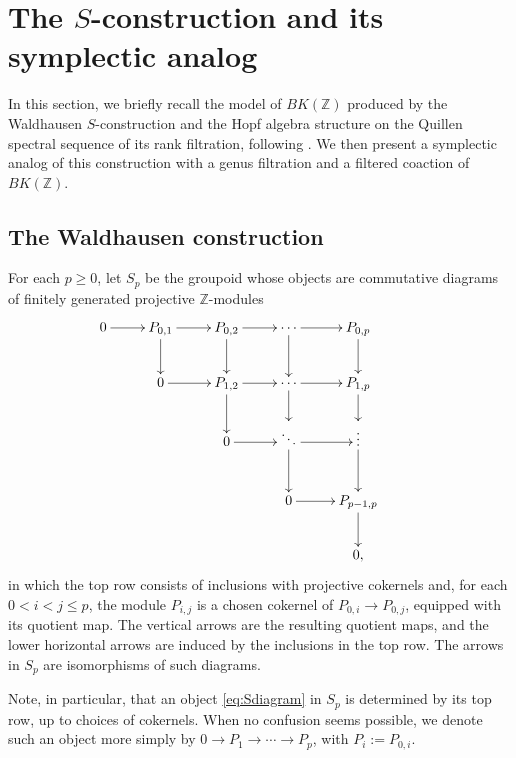 \documentclass[12 pt]{amsart}
\newcommand{\ZZ}{\mathbb{Z}}
\newcommand{\<}{\langle}
\renewcommand{\>}{\rangle}
\theoremstyle{definition}
\begin{document}
\section{The \texorpdfstring{$S$}{S}-construction and its symplectic analog}\label{sec:S-constructions}

In this section, we briefly recall the model of $BK(\ZZ)$ produced by the Waldhausen $S$-construction and the Hopf algebra structure on the Quillen spectral sequence of its rank filtration, following \cite[Sections~2--3]{BCGP}. We then present a symplectic analog of this construction with a genus filtration and a filtered coaction of $BK(\ZZ)$.

\subsection{The Waldhausen construction}\label{sec:S}

For each $p \geq 0$, let $S_p$ be the groupoid whose objects are commutative diagrams of finitely generated projective $\ZZ$-modules
\begin{equation} \label{eq:Sdiagram}
\begin{aligned}
\xymatrix {0 \ar[r] & P_{0, 1} \ar[d] \ar[r] & P_{0, 2} \ar[d] \ar[r] & \cdots \ar[d] \ar[r] & P_{0, p} \ar[d]\\
& 0 \ar[r] & P_{1, 2} \ar[d] \ar[r] & \cdots \ar[d] \ar[r]  & P_{1, p} \ar[d] \\
& & 0 \ar[r] & \ddots \ar[d] \ar[r] & \vdots \ar[d] &  \\ & & & 0  \ar[r] & P_{p - 1, p} \ar[d]  \\
& & & & 0,}
\end{aligned}
\end{equation}
in which the top row consists of inclusions with projective cokernels and, for each $0 < i < j \leq p$, the module $P_{i, j}$ is a chosen cokernel of $P_{0, i} \to P_{0, j}$, equipped with its quotient map. The vertical arrows are the resulting quotient maps, and the lower horizontal arrows are induced by the inclusions in the top row. The arrows in $S_p$ are isomorphisms of such diagrams.

Note, in particular, that an object \eqref{eq:Sdiagram} in $S_p$ is determined by its top row, up to choices of cokernels. When no confusion seems possible, we denote such an object more simply by $0 \to P_1 \to \cdots \to P_p$, with $P_i := P_{0, i}$.
\end{document}
